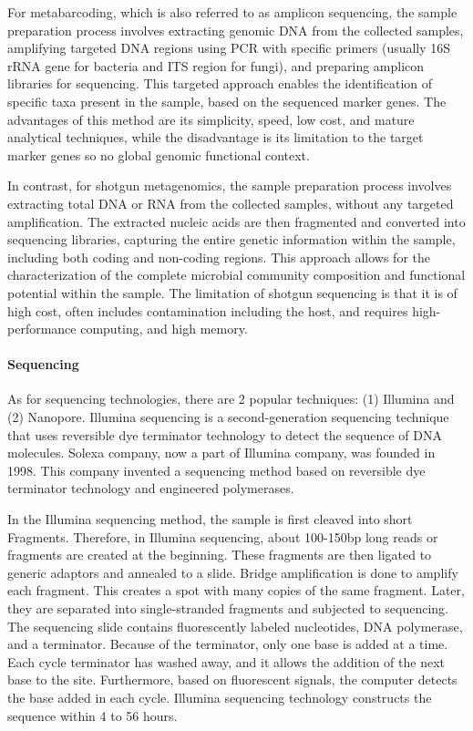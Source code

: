         For metabarcoding, which is also referred to as amplicon sequencing, the sample preparation process involves extracting genomic DNA from the collected samples, amplifying targeted DNA regions using PCR with specific primers (usually 16S rRNA gene for bacteria and ITS region for fungi), and preparing amplicon libraries for sequencing. This targeted approach enables the identification of specific taxa present in the sample, based on the sequenced marker genes. The advantages of this method are its simplicity, speed, low cost, and mature analytical techniques, while the disadvantage is its limitation to the target marker genes so no global genomic functional context.
                    
        In contrast, for shotgun metagenomics, the sample preparation process involves extracting total DNA or RNA from the collected samples, without any targeted amplification. The extracted nucleic acids are then fragmented and converted into sequencing libraries, capturing the entire genetic information within the sample, including both coding and non-coding regions. This approach allows for the characterization of the complete microbial community composition and functional potential within the sample. The limitation of shotgun sequencing is that it is of high cost, often includes contamination including the host, and requires high-performance computing, and high memory.

        \paragraph*{Sequencing}
        
        As for sequencing technologies, there are 2 popular techniques: (1) Illumina and (2) Nanopore. Illumina sequencing is a second-generation sequencing technique that uses reversible dye terminator technology to detect the sequence of DNA molecules. Solexa company, now a part of Illumina company, was founded in 1998. This company invented a sequencing method based on reversible dye terminator technology and engineered polymerases.
                
        In the Illumina sequencing method, the sample is first cleaved into short Fragments. Therefore, in Illumina sequencing, about 100-150bp long reads or fragments are created at the beginning. These fragments are then ligated to generic adaptors and annealed to a slide. Bridge amplification is done to amplify each fragment. This creates a spot with many copies of the same fragment. Later, they are separated into single-stranded fragments and subjected to sequencing. The sequencing slide contains fluorescently labeled nucleotides, DNA polymerase, and a terminator. Because of the terminator, only one base is added at a time. Each cycle terminator has washed away, and it allows the addition of the next base to the site. Furthermore, based on fluorescent signals, the computer detects the base added in each cycle. Illumina sequencing technology constructs the sequence within 4 to 56 hours\cite{quail2008large}.
                
